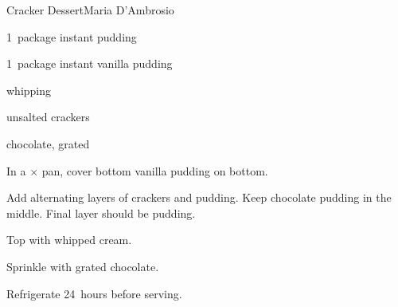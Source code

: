 \begin{recipe}{Cracker Dessert}{Maria D'Ambrosio}{}

\begin{ingredients}
\item 1~package instant  pudding
\item 1~package instant vanilla pudding
\item {} whipping 
\item unsalted crackers
\item chocolate, grated
\end{ingredients}

\begin{directions}
\item In a $\times$ pan, cover bottom vanilla pudding on bottom.
\item Add alternating layers of crackers and pudding. Keep chocolate pudding in the middle. Final layer should be pudding.
\item Top with whipped cream.
\item Sprinkle with grated chocolate.
\item Refrigerate 24~hours before serving.
\end{directions}

\end{recipe}

